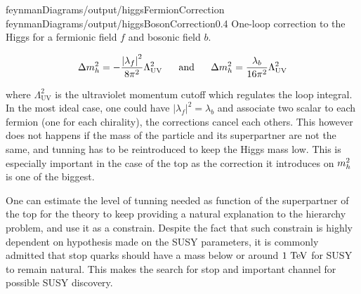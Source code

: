         {feynmanDiagrams/output/higgsFermionCorrection}
        {feynmanDiagrams/output/higgsBosonCorrection}{0.4}
        {One-loop correction to the Higgs for a fermionic field $f$ and bosonic field $b$.}

        \begin{equation}
            \Delta m_{h}^2 = - \frac{\left| \lambda_f \right|^2}{8\pi^2} \Lambda^2_{\text{UV}}
            \, \, \, \, \, \, \, \, \, \, \text{and} \, \, \, \, \, \, \, \, \, \,
            \Delta m_{h}^2 =   \frac{\lambda_b}{16\pi^2} \Lambda^2_{\text{UV}}
        \end{equation}

        where $\Lambda^2_{\text{UV}}$ is the ultraviolet momentum cutoff which regulates
        the loop integral. In the most ideal case, one could have $\left| \lambda_f \right|^2
        = \lambda_b$ and associate two scalar to each fermion (one for each chirality),
        the corrections cancel each others. 
        This however does not happens if the mass of the particle and its superpartner
        are not the same, and tunning has to be reintroduced to keep the Higgs mass low.
        This is especially important in the case of the top as the correction it introduces
        on $m_{h}^2$ is one of the biggest.

        One can estimate the level of tunning needed as function of the superpartner of
        the top for the theory to keep providing a natural explanation to the hierarchy
        problem, and use it as a constrain. Despite the fact that such constrain is
        highly dependent on hypothesis made on the SUSY parameters, it is commonly admitted
        that stop quarks should have a mass below or around $1~\text{TeV}$ for SUSY to remain natural.
        This makes the search for stop and important channel for possible SUSY discovery.



